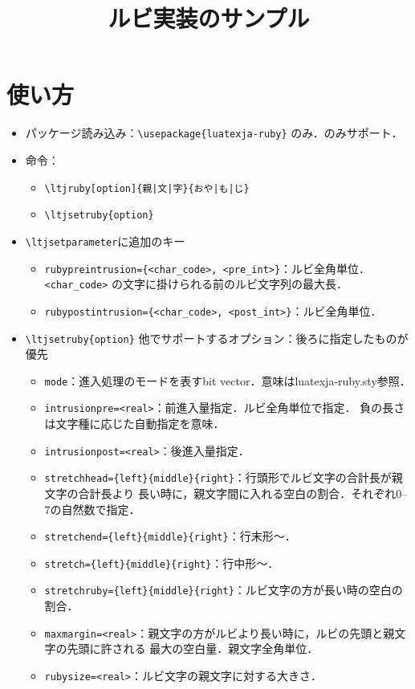 \documentclass[b5paper,10pt]{ltjsarticle}
\title{ルビ実装のサンプル}
\begin{document}

\maketitle

\section{使い方}
\begin{itemize}
\item パッケージ読み込み：\verb+\usepackage{luatexja-ruby}+ のみ．\LaTeXe のみサポート．
\item 命令：
\begin{itemize}
\item \verb+\ltjruby[option]{親|文|字}{おや|も|じ}+
\item \verb|\ltjsetruby{option}|
\end{itemize}
\item \verb|\ltjsetparameter|に追加のキー
\begin{itemize}
\item \verb+rubypreintrusion={<char_code>, <pre_int>}+：ルビ全角単位．
\verb+<char_code>+ の文字に掛けられる前のルビ文字列の最大長．
\item \verb+rubypostintrusion={<char_code>, <post_int>}+：ルビ全角単位．
\end{itemize}
\item \verb|\ltjsetruby{option}| 他でサポートするオプション：後ろに指定したものが優先
\begin{itemize}
\item \verb+mode+：進入処理のモードを表すbit vector．意味はluatexja-ruby.sty参照．
\item \verb+intrusionpre=<real>+：前進入量指定．ルビ全角単位で指定．
負の長さは文字種に応じた自動指定を意味．
\item \verb+intrusionpost=<real>+：後進入量指定．
\item \verb+stretchhead={left}{middle}{right}+：行頭形でルビ文字の合計長が親文字の合計長より
長い時に，親文字間に入れる空白の割合．それぞれ0--7の自然数で指定．
\item \verb+stretchend={left}{middle}{right}+：行末形〜．
\item \verb+stretch={left}{middle}{right}+：行中形〜．
\item \verb+stretchruby={left}{middle}{right}+：ルビ文字の方が長い時の空白の割合．
\item \verb+maxmargin=<real>+：親文字の方がルビより長い時に，ルビの先頭と親文字の先頭に許される
最大の空白量．親文字全角単位．
\item \verb+rubysize=<real>+：ルビ文字の親文字に対する大きさ．
\end{itemize}
\end{itemize}
\end{document}
